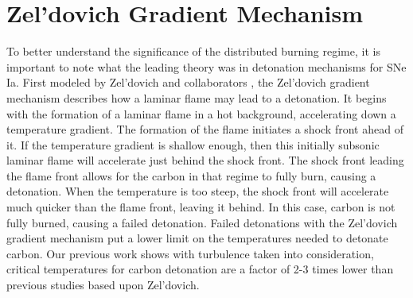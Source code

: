 \section{Zel'dovich Gradient Mechanism}

To better understand the significance of the distributed burning regime, it is important to note what the leading theory was in detonation mechanisms for SNe Ia. First modeled by Zel'dovich and collaborators \cite{zeldovichetal70}, the Zel'dovich gradient mechanism describes how a laminar flame may lead to a detonation. It begins with the formation of a laminar flame in a hot background, accelerating down a temperature gradient. The formation of the flame initiates a shock front ahead of it. If the temperature gradient is shallow enough, then this initially subsonic laminar flame will accelerate just behind the shock front. The shock front leading the flame front allows for the carbon in that regime to fully burn, causing a detonation. When the temperature is too steep, the shock front will accelerate much quicker than the flame front, leaving it behind. In this case, carbon is not fully burned, causing a failed detonation. Failed detonations with the Zel'dovich gradient mechanism put a lower limit on the temperatures needed to detonate carbon. Our previous work shows with turbulence taken into consideration, critical temperatures for carbon detonation are a factor of 2-3 times lower than previous studies based upon Zel'dovich. 
